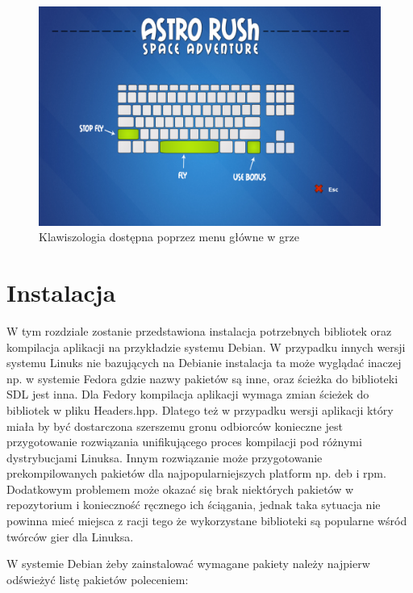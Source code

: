 \begin{figure}[h]
    \centering
    \includegraphics[width=429px]{./Pictures/menu3.png}
    \caption{Klawiszologia dostępna poprzez menu główne w grze}
\end{figure}


\section{Instalacja}
W tym rozdziale zostanie przedstawiona instalacja potrzebnych bibliotek oraz kompilacja aplikacji na przykładzie systemu Debian. W przypadku innych wersji systemu Linuks nie bazujących na Debianie instalacja ta może wyglądać inaczej np. w systemie Fedora gdzie nazwy pakietów są inne, oraz ścieżka do biblioteki SDL jest inna. Dla Fedory kompilacja aplikacji wymaga zmian ścieżek do bibliotek w pliku Headers.hpp. Dlatego też w przypadku wersji aplikacji który miała by być dostarczona szerszemu gronu odbiorców konieczne jest przygotowanie rozwiązania unifikującego proces kompilacji pod różnymi dystrybucjami Linuksa. Innym rozwiązanie może przygotowanie prekompilowanych pakietów dla najpopularniejszych platform np. deb i rpm. Dodatkowym problemem może okazać się brak niektórych pakietów w repozytorium i konieczność ręcznego ich ściągania, jednak taka sytuacja nie powinna mieć miejsca z racji tego że wykorzystane biblioteki są popularne wśród twórców gier dla Linuksa. 

W systemie Debian żeby zainstalować wymagane pakiety należy najpierw odświeżyć listę pakietów poleceniem: 

